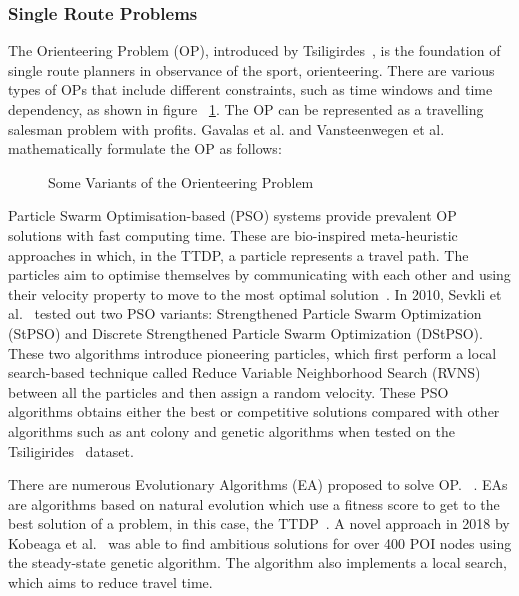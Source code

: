 \subsubsection{Single Route Problems}

The Orienteering Problem (OP), introduced by Tsiligirdes~\cite{Tsiligirides1984}, is the foundation of
single route planners in observance of the sport, orienteering. There are
various types of OPs that include different constraints, such as time windows
and time dependency, as shown in figure ~\ref{variants}. The OP can be represented as a
travelling salesman problem with profits. Gavalas et al. and Vansteenwegen et al.~\cite{Gavalas2014a, Vansteenwegen2011b}
mathematically formulate the OP as follows:






\begin{figure}[h]
\caption{Some Variants of the Orienteering Problem}
\label{variants}
\end{figure}




Particle Swarm Optimisation-based (PSO) systems provide prevalent OP solutions
with fast computing time. These are bio-inspired meta-heuristic approaches in
which, in the TTDP, a particle represents a travel path. The particles aim to
optimise themselves by communicating with each other and using their velocity
property to move to the most optimal solution~\cite{RezaeeJordehi2013}. In 2010, Sevkli
et al.~\cite{Sevkli2010,Sevkli2010a} tested out two PSO variants:
Strengthened Particle Swarm Optimization (StPSO) and Discrete Strengthened
Particle Swarm Optimization (DStPSO). These two algorithms introduce pioneering
particles, which first perform a local search-based technique called Reduce
Variable Neighborhood Search (RVNS) between all the particles and then assign a
random velocity. These PSO algorithms obtains either the best or competitive
solutions compared with other algorithms such as ant colony and genetic
algorithms when tested on the Tsiligirides~\cite{Tsiligirides1984, Chen2011a} dataset.


There are numerous Evolutionary Algorithms (EA) proposed to solve OP.\@
~\cite{Kobeaga2018,Wang2008}. EAs are algorithms based on natural evolution which
use a fitness score to get to the best solution of a problem, in this case, the
TTDP~\cite{Gunawan2016}. A novel approach in 2018  by Kobeaga et al.~\cite{Kobeaga2018} was able
to find ambitious solutions for over 400 POI nodes using the steady-state
genetic algorithm. The algorithm also implements a local
search, which aims to reduce travel time. 

